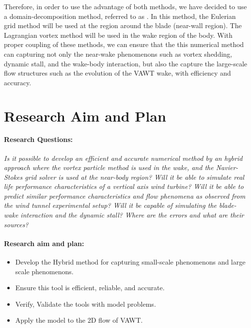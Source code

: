 Therefore, in order to use the advantage of both methods, we have decided to use a domain-decomposition method, referred to as . In this method, the Eulerian grid method will be used at the region around the blade (near-wall region). The Lagrangian vortex method will be used in the wake region of the body. With proper coupling of these methods, we can ensure that the this numerical method can capturing not only the near-wake phenomenons such as vortex shedding, dynamic stall, and the wake-body interaction, but also the capture the large-scale flow structures such as the evolution of the VAWT wake, with efficiency and accuracy.

\section{Research Aim and Plan}

\paragraph*{Research Questions:} \textit{Is it possible to develop an efficient and accurate numerical method by an
hybrid approach where the vortex particle method is used in the wake, and the Navier-Stokes grid solver is
used at the near-body region? Will it be able to simulate real life performance characteristics of a vertical
axis wind turbine? Will it be able to predict similar performance characteristics and flow phenomena as observed from the wind tunnel experimental setup? Will it be capable of simulating the blade-wake interaction
and the dynamic stall? Where are the errors and what are their sources?}

\paragraph*{Research aim and plan:}

	\begin{itemize}
	\item Develop the Hybrid method for capturing small-scale phenomenons and large scale phenomenons.
	\item Ensure this tool is efficient, reliable, and accurate.
	\item Verify, Validate the tools with model problems.
	\item Apply the model to the 2D flow of VAWT.
	\end{itemize}

